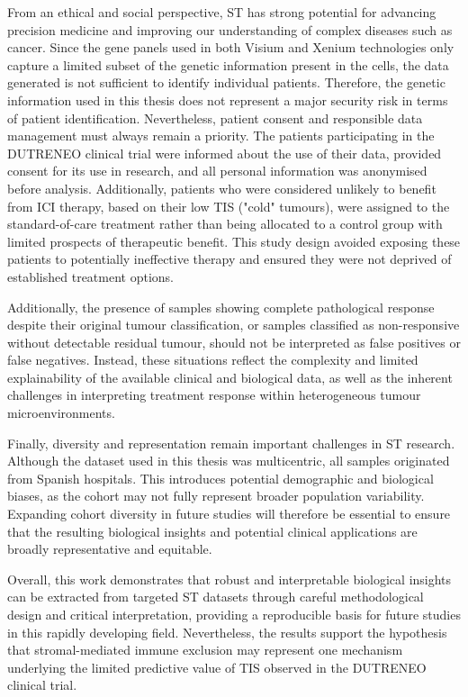From an ethical and social perspective, ST has strong potential for advancing precision medicine and improving our understanding of complex diseases such as cancer. Since the gene panels used in both Visium and Xenium technologies only capture a limited subset of the genetic information present in the cells, the data generated is not sufficient to identify individual patients. Therefore, the genetic information used in this thesis does not represent a major security risk in terms of patient identification. Nevertheless, patient consent and responsible data management must always remain a priority. The patients participating in the DUTRENEO clinical trial were informed about the use of their data, provided consent for its use in research, and all personal information was anonymised before analysis. Additionally, patients who were considered unlikely to benefit from ICI therapy, based on their low TIS ("cold" tumours), were assigned to the standard-of-care treatment rather than being allocated to a control group with limited prospects of therapeutic benefit. This study design avoided exposing these patients to potentially ineffective therapy and ensured they were not deprived of established treatment options.

Additionally, the presence of samples showing complete pathological response despite their original tumour classification, or samples classified as non-responsive without detectable residual tumour, should not be interpreted as false positives or false negatives. Instead, these situations reflect the complexity and limited explainability of the available clinical and biological data, as well as the inherent challenges in interpreting treatment response within heterogeneous tumour microenvironments.

Finally, diversity and representation remain important challenges in ST research. Although the dataset used in this thesis was multicentric, all samples originated from Spanish hospitals. This introduces potential demographic and biological biases, as the cohort may not fully represent broader population variability. Expanding cohort diversity in future studies will therefore be essential to ensure that the resulting biological insights and potential clinical applications are broadly representative and equitable.

Overall, this work demonstrates that robust and interpretable biological insights can be extracted from targeted ST datasets through careful methodological design and critical interpretation, providing a reproducible basis for future studies in this rapidly developing field. Nevertheless, the results support the hypothesis that stromal-mediated immune exclusion may represent one mechanism underlying the limited predictive value of TIS observed in the DUTRENEO clinical trial.


